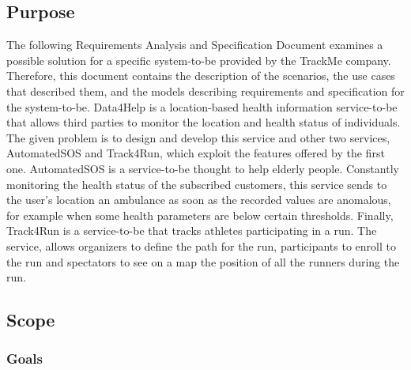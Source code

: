 \subsection{Purpose} 
The following Requirements Analysis and Specification Document examines a possible solution for a specific system-to-be provided by the TrackMe company. Therefore, this document contains the description of the scenarios, the use cases that described them, and the models describing requirements and specification for the system-to-be.
\bigbreak
\noindent
Data4Help is a location-based health information service-to-be that allows third parties to monitor the location and health status of individuals. The given problem is to design and develop this service and other two services, AutomatedSOS and Track4Run, which exploit the features offered by the first one.
\bigbreak
\noindent
AutomatedSOS is a service-to-be thought to help elderly people. Constantly monitoring the health status of the subscribed customers, this service sends to the user's location an ambulance as soon as the recorded values are anomalous, for example when some health parameters are below certain thresholds.
\bigbreak
\noindent
Finally, Track4Run is a service-to-be that tracks athletes participating in a run. The service, allows organizers to define the path for the run, participants to enroll to the run and spectators to see on a map the position of all the runners during the run.
\subsection{Scope}
\subsubsection{Goals}

